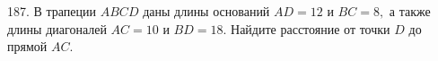 187. В трапеции $ABCD$ даны длины оснований $AD=12$ и $BC=8,$ а также длины диагоналей $AC=10$ и $BD=18.$ Найдите расстояние от точки $D$ до прямой $AC.$\\
